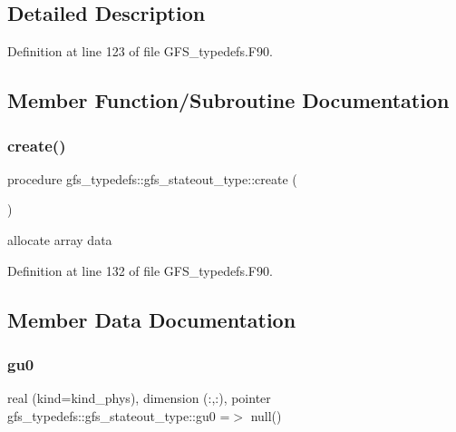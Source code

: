 \subsection{Detailed Description}


Definition at line 123 of file G\+F\+S\+\_\+typedefs.\+F90.



\subsection{Member Function/\+Subroutine Documentation}
\mbox{\label{structgfs__typedefs_1_1gfs__stateout__type_a5f4cd4787451d1ce332b31a366326616}} 
\subsubsection{create()}
{\footnotesize\ttfamily procedure gfs\+\_\+typedefs\+::gfs\+\_\+stateout\+\_\+type\+::create (\begin{DoxyParamCaption}{ }\end{DoxyParamCaption})}



allocate array data 



Definition at line 132 of file G\+F\+S\+\_\+typedefs.\+F90.



\subsection{Member Data Documentation}
\mbox{\label{structgfs__typedefs_1_1gfs__stateout__type_a8722526c2aba6b45a0289ec11c480561}} 
\subsubsection{gu0}
{\footnotesize\ttfamily real (kind=kind\+\_\+phys), dimension (\+:,\+:), pointer gfs\+\_\+typedefs\+::gfs\+\_\+stateout\+\_\+type\+::gu0 =$>$ null()}



